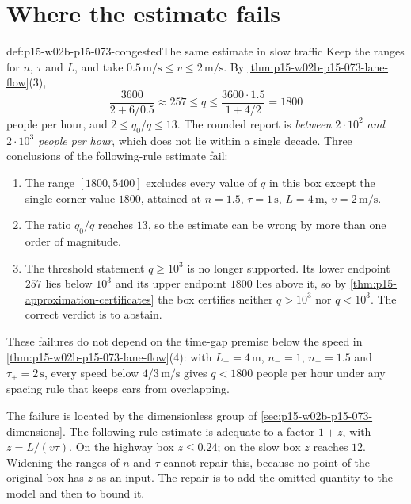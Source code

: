 \section{Where the estimate fails}
\label{sec:p15-w02b-p15-073-failure}

\begin{hbexample}{def:p15-w02b-p15-073-congested}{The same estimate in slow traffic}
Keep the ranges for \(n\), \(\tau\) and \(L\), and take
\(0.5\,\mathrm{m/s}\leq v\leq2\,\mathrm{m/s}\). By
\cref{thm:p15-w02b-p15-073-lane-flow}(3),
\[
 \frac{3600}{2+6/0.5}\approx257\leq q\leq\frac{3600\cdot1.5}{1+4/2}=1800
\]
people per hour, and \(2\leq q_0/q\leq13\).
The rounded report is \emph{between \(2\cdot10^2\) and \(2\cdot10^3\) people
per hour}, which does not lie within a single decade. Three conclusions of
the following-rule estimate fail:
\begin{enumerate}
\item The range \([1800,5400]\) excludes every value of \(q\) in this box
except the single corner value \(1800\), attained at \(n=1.5\),
\(\tau=1\,\mathrm s\), \(L=4\,\mathrm m\), \(v=2\,\mathrm{m/s}\).
\item The ratio \(q_0/q\) reaches \(13\), so the estimate can be wrong by
more than one order of magnitude.
\item The threshold statement \(q\geq10^3\) is no longer supported. Its
lower endpoint \(257\) lies below \(10^3\) and its upper endpoint \(1800\)
lies above it, so by \cref{thm:p15-approximation-certificates} the box
certifies neither \(q>10^3\) nor \(q<10^3\). The correct verdict is to abstain.
\end{enumerate}
These failures do not depend on the time-gap premise below the speed in
\cref{thm:p15-w02b-p15-073-lane-flow}(4): with \(L_-=4\,\mathrm m\),
\(n_-=1\), \(n_+=1.5\) and \(\tau_+=2\,\mathrm s\), every speed below
\(4/3\,\mathrm{m/s}\) gives \(q<1800\) people per hour under any spacing
rule that keeps cars from overlapping.
\end{hbexample}

The failure is located by the dimensionless group of
\cref{sec:p15-w02b-p15-073-dimensions}. The following-rule estimate is
adequate to a factor \(1+z\), with \(z=L/(v\tau)\). On the highway box
\(z\leq0.24\); on the slow box \(z\) reaches \(12\). Widening the ranges of
\(n\) and \(\tau\) cannot repair this, because no point of the original box
has \(z\) as an input. The repair is to add the omitted quantity to the model
and then to bound it.


